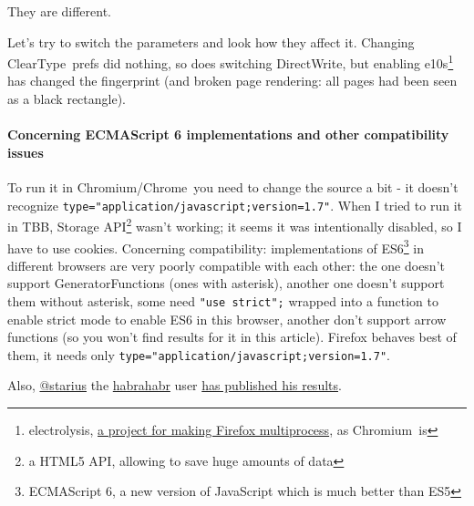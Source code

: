 \documentclass[letterpaper,14pt]{article}
\begin{document}
They are different.

Let's try to switch the parameters and look how they affect it. Changing ClearType\texttrademark\ prefs did nothing, so does switching DirectWrite, but enabling e10s\footnote{electrolysis, \href{https://wiki.mozilla.org/Electrolysis}{a project for making Firefox multiprocess}, as Chromium\texttrademark\ is} has changed the fingerprint (and broken page rendering: all pages had been seen as a black rectangle).



\paragraph{Concerning ECMAScript 6 implementations and other compatibility issues}\label{concerning-ecmascript-6-implementations}

To run it in Chromium\texttrademark/Chrome\texttrademark\ you need to change the source a bit - it doesn't recognize \lstinline!type="application/javascript;version=1.7"!. When I tried to run it in TBB, Storage API\footnote{a HTML5 API, allowing to save huge amounts of data} wasn't working; it seems it was intentionally disabled, so I have to use cookies. Concerning compatibility: implementations of ES6\footnote{ECMAScript 6, a new version of JavaScript which is much better than ES5} in different browsers are very poorly compatible with each other: the one doesn't support GeneratorFunctions (ones with asterisk), another one doesn't support them without asterisk, some need \lstinline!"use strict";! wrapped into a function to enable strict mode to enable ES6 in this browser, another don't support arrow functions (so you won't find results for it in this article). Firefox behaves best of them, it needs only \lstinline!type="application/javascript;version=1.7"!.




Also, \href{https://geektimes.ru/users/starius/}{@starius} the \href{http://habrahabr.ru/}{habrahabr} user \href{https://geektimes.ru/post/244484/\#comment_8227810}{has published his results}.


\end{document}

